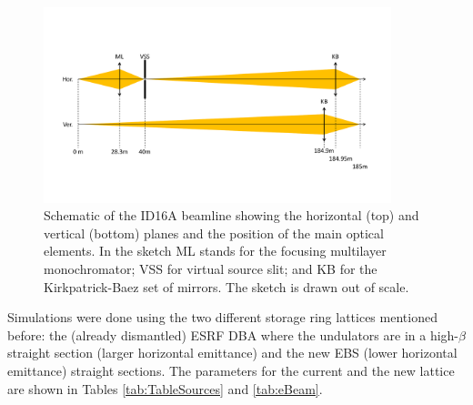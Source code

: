 \documentclass{iucr}              %
\begin{document}
\begin{figure}\label{fig:ID16A}
    \centering
    \includegraphics[width=0.9\textwidth,clip=true,trim=50 85 50 85]{GRAPHICS/ID16A.pdf}
    \caption{Schematic of the ID16A beamline showing the horizontal (top) and vertical (bottom) planes and the position of the main optical elements. In the sketch ML stands for the focusing multilayer monochromator; VSS for virtual source slit; and KB for the Kirkpatrick-Baez set of mirrors. The sketch is drawn out of scale.}
\end{figure}


\begin{table}\label{tab:Positions}
    \caption{Position of the main ID16A optical elements with respect to the source (undulator centre). It also shows the values for horizontal and vertical demagnification $M^{-1}=p/q$, where $p$ and $q$ are the the distances object-optics and optics-image, respectively.}
\end{table}


Simulations were done using the two different storage ring lattices mentioned before: the (already dismantled) ESRF DBA where the undulators are in a high-$\beta$ straight section (larger horizontal emittance) and the new EBS (lower horizontal emittance) straight sections. The parameters for the current and the new lattice are shown in Tables \ref{tab:TableSources} and \ref{tab:eBeam}.
\end{document}
